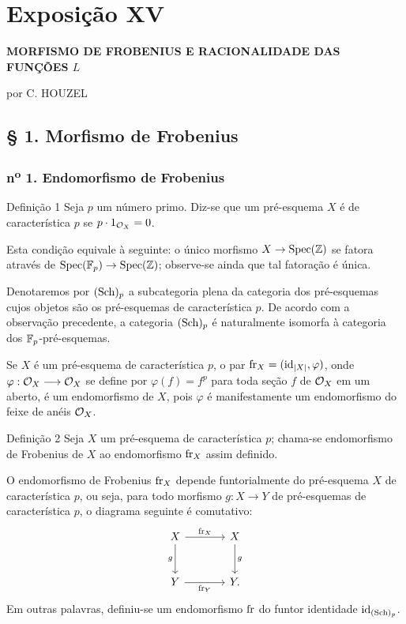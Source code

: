 \clearpage
\section*{Exposição XV}
\begin{center}
\Large\bfseries MORFISMO DE FROBENIUS E RACIONALIDADE DAS FUNÇÕES $L$

\medskip
por C. HOUZEL
\end{center}

\subsection*{§ 1. Morfismo de Frobenius}

\subsubsection*{n\textsuperscript{o} 1. Endomorfismo de Frobenius}

\begin{statement}{Definição 1}
Seja $p$ um número primo. Diz-se que um pré-esquema $X$ é de característica $p$ se $p\cdot 1_{\mathcal{O}_X}=0$.
\end{statement}

Esta condição equivale à seguinte: o único morfismo $X\to\operatorname{Spec}(\mathbb Z)$ se fatora através de $\operatorname{Spec}(\mathbb F_p)\to\operatorname{Spec}(\mathbb Z)$; observe-se ainda que tal fatoração é única.

Denotaremos por $(\operatorname{Sch})_p$ a subcategoria plena da categoria dos pré-esquemas cujos objetos são os pré-esquemas de característica $p$. De acordo com a observação precedente, a categoria $(\operatorname{Sch})_p$ é naturalmente isomorfa à categoria dos $\mathbb F_p$-pré-esquemas.

Se $X$ é um pré-esquema de característica $p$, o par $\operatorname{fr}_X=(\operatorname{id}_{|X|},\varphi)$, onde $\varphi:\mathcal{O}_X\longrightarrow\mathcal{O}_X$ se define por $\varphi(f)=f^p$ para toda seção $f$ de $\mathcal{O}_X$ em um aberto, é um endomorfismo de $X$, pois $\varphi$ é manifestamente um endomorfismo do feixe de anéis $\mathcal{O}_X$.

\begin{statement}{Definição 2}
Seja $X$ um pré-esquema de característica $p$; chama-se endomorfismo de Frobenius de $X$ ao endomorfismo $\operatorname{fr}_X$ assim definido.
\end{statement}

O endomorfismo de Frobenius $\operatorname{fr}_X$ depende funtorialmente do pré-esquema $X$ de característica $p$, ou seja, para todo morfismo $g:X\to Y$ de pré-esquemas de característica $p$, o diagrama seguinte é comutativo:
\[
\begin{tikzcd}[column sep=large,row sep=large]
X \arrow[r,"\fr_X"] \arrow[d,"g"'] & X \arrow[d,"g"]\\
Y \arrow[r,"\fr_Y"'] & Y.
\end{tikzcd}
\]
Em outras palavras, definiu-se um endomorfismo $\operatorname{fr}$ do funtor identidade $\operatorname{id}_{(\operatorname{Sch})_p}$.
